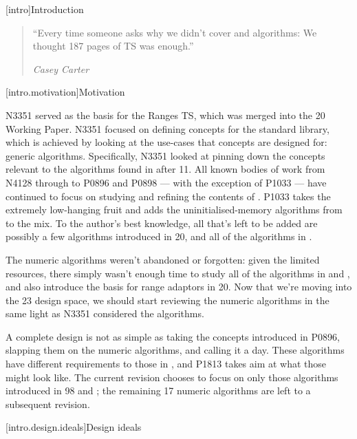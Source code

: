[intro]{Introduction}

\begin{quote}
``Every time someone asks why we didn’t cover  and  algorithms: We
thought 187 pages of TS was enough.''
\begin{flushright}
\textemdash \textit{Casey Carter}
\end{flushright}
\end{quote}

[intro.motivation]{Motivation}

N3351\cite{N3351} served as the basis for the Ranges TS\cite{N4685}, which was merged into the
\Cpp{}20 Working Paper\cite{P0898}\cite{P0896}. N3351 focused on defining concepts for the standard
library, which is achieved by looking at the use-cases that concepts are designed for: generic
algorithms. Specifically, N3351 looked at pinning down the concepts relevant to the algorithms found
in  after \Cpp{}11. All known bodies of work from N4128\cite{N4128} through to
P0896 and P0898 --- with the exception of P1033\cite{P1033} --- have continued to focus on studying
and refining the contents of . P1033 takes the extremely low-hanging fruit and
adds the uninitialised-memory algorithms from  to the mix. To the author's best
knowledge, all that's left to be added are possibly a few algorithms introduced in \Cpp{}20, and all
of the algorithms in .

The numeric algorithms weren't abandoned or forgotten: given the limited resources, there simply
wasn't enough time to study all of the algorithms in  and , and
also introduce the basis for range adaptors in \Cpp{}20. Now that we're moving into the \Cpp{}23
design space, we should start reviewing the numeric algorithms in the same light as N3351 considered
the  algorithms.

A complete design is not as simple as taking the concepts introduced in P0896, slapping them on the
numeric algorithms, and calling it a day. These algorithms have different requirements to those in
, and P1813 takes aim at what those might look like. The current revision chooses
to focus on only those algorithms introduced in \Cpp{}98 and ; the remaining \Cpp{}17
numeric algorithms are left to a subsequent revision.

[intro.design.ideals]{Design ideals}

